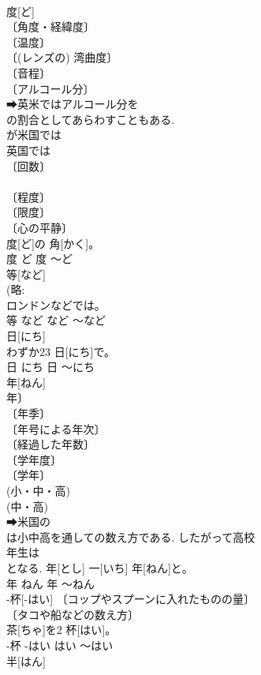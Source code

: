 \documentclass[8pt]{extreport}
\begin{document}
\begin{CJK}{UTF8}{min}
\\	度[ど]	
\\	〔角度・経緯度〕 
\\	〔温度〕 
\\	〔(レンズの) 湾曲度〕 
\\	〔音程〕 
\\	〔アルコール分〕 
\\	➡英米ではアルコール分を 
\\	の割合としてあらわすこともある. 
\\	が米国では 
\\	英国では 
\\	〔回数〕 
\\	[⇒いちど 
\\	にど] 
\\	〔程度〕 
\\	〔限度〕 
\\	〔心の平静〕 
\\	度[ど]の 角[かく]。	
\\	度	ど	度	〜ど	
\\	等[など]	
\\	(略: 
\\	ロンドンなどでは。	
\\	等	など	など	〜など	
\\	日[にち]	
\\	わずか23 日[にち]で。	
\\	日	にち	日	〜にち	
\\	年[ねん]	
\\	年〕 
\\	〔年季〕 
\\	〔年号による年次〕 
\\	〔経過した年数〕 
\\	〔学年度〕 
\\	〔学年〕 
\\	(小・中・高) 
\\	(中・高) 
\\	➡米国の 
\\	は小中高を通しての数え方である. したがって高校 
\\	年生は 
\\	となる.	年[とし] 一[いち] 年[ねん]と。	
\\	年	ねん	年	〜ねん	
\\	-杯[-はい]	〔コップやスプーンに入れたものの量〕 
\\	〔タコや船などの数え方〕 
\\	茶[ちゃ]を2 杯[はい]。	
\\	-杯	-はい	はい	〜はい	
\\	半[はん]	

\end{CJK}
\end{document}
